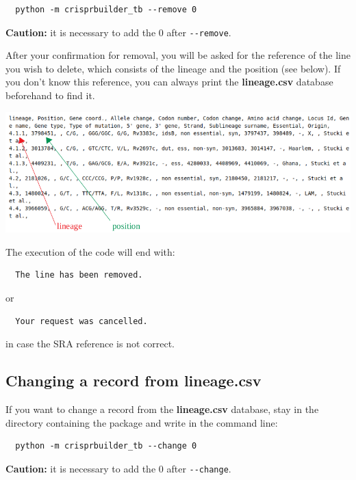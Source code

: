 \documentclass[twoside,a4paper,11pt,frenchb,openany]{report}
\begin{document}
    \begin{verbatim}
  python -m crisprbuilder_tb --remove 0
\end{verbatim}

    \textbf{Caution:} it is necessary to add the 0 after
\texttt{-\/-remove}.

After your confirmation for removal, you will be asked for the reference
of the line you wish to delete, which consists of the lineage and the
position (see below). If you don't know this reference, you can always
print the \textbf{lineage.csv} database beforehand to find it.

\includegraphics[width=16cm]{selection.png}

    The execution of the code will end with:

    \begin{verbatim}
  The line has been removed.
\end{verbatim}

    or

    \begin{verbatim}
  Your request was cancelled.
\end{verbatim}

    in case the SRA reference is not correct.


    \subsection{Changing a record from
lineage.csv}\label{changing-a-record-from-lineage.csv}

    If you want to change a record from the \textbf{lineage.csv} database,
stay in the directory containing the package and write in the command
line:

    \begin{verbatim}
  python -m crisprbuilder_tb --change 0
\end{verbatim}

    \textbf{Caution:} it is necessary to add the 0 after
\texttt{-\/-change}.
\end{document}
